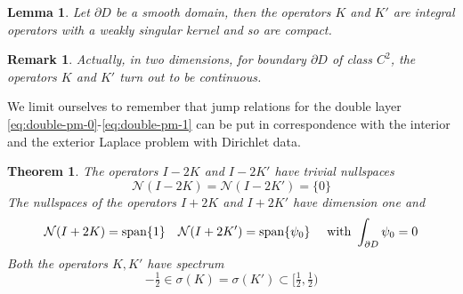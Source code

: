 \documentclass[10pt, a4paper, twoside, openright]{book}
\theoremstyle{definition}
\theoremstyle{plain}
\newtheorem{theorem}[subsection]{Theorem}
\theoremstyle{plain}
\theoremstyle{plain}
\theoremstyle{plain}
\newtheorem{remark}[subsection]{Remark}
\theoremstyle{plain}
\newtheorem{lemma}[subsection]{Lemma}
\theoremstyle{plain}
\theoremstyle{plain}
\theoremstyle{plain}
\begin{document}
\begin{lemma}
 Let $\partial D$ be a smooth domain, then the operators $K$ and $K'$ are integral operators with a weakly singular kernel and so are compact.
\end{lemma}
\begin{remark}
 Actually, in two dimensions, for boundary $\partial D$ of class $C^2$, the operators $K$ and $K'$ turn out to be continuous.
\end{remark}
We limit ourselves to remember that jump relations for the double layer \ref{eq:double-pm-0}-\ref{eq:double-pm-1} can be put in correspondence with the interior and the exterior Laplace problem with Dirichlet data.
\begin{theorem}
\label{theo:K-nullspace}
 The operators $I-2K$ and $I-2K'$ have trivial nullspaces
 \begin{equation}
  \mathcal{N}(I-2K)=\mathcal{N}(I-2K')=\{0\}
 \end{equation}
 The nullspaces of the operators $I+2K$ and $I+2K'$ have dimension one and
 \begin{equation}
  \mathcal{N}(I+2K)=\textup{span}\{1\} \quad \mathcal{N}(I+2K')=\textup{span}\{\psi_0\}\quad\textup{ with }\int_{\partial D}\psi_0=0
 \end{equation}
 Both the operators $K,K'$ have spectrum
 \begin{equation}
 \label{eq:K-spectrum}
  -\tfrac{1}{2}\in\sigma(K)=\sigma(K')\subset \bigl[\tfrac{1}{2}, \tfrac{1}{2}\bigr)
 \end{equation}
\end{theorem}
\end{document}
